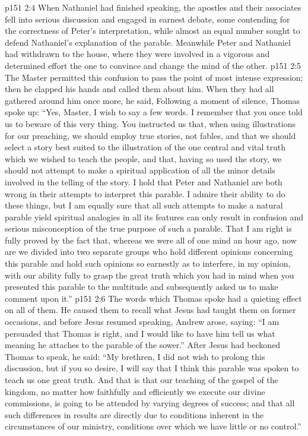 \vs p151 2:4 When Nathaniel had finished speaking, the apostles and their associates fell into serious discussion and engaged in earnest debate, some contending for the correctness of Peter’s interpretation, while almost an equal number sought to defend Nathaniel’s explanation of the parable. Meanwhile Peter and Nathaniel had withdrawn to the house, where they were involved in a vigorous and determined effort the one to convince and change the mind of the other.
\vs p151 2:5 The Master permitted this confusion to pass the point of most intense expression; then he clapped his hands and called them about him. When they had all gathered around him once more, he said,  Following a moment of silence, Thomas spoke up: “Yes, Master, I wish to say a few words. I remember that you once told us to beware of this very thing. You instructed us that, when using illustrations for our preaching, we should employ true stories, not fables, and that we should select a story best suited to the illustration of the one central and vital truth which we wished to teach the people, and that, having so used the story, we should not attempt to make a spiritual application of all the minor details involved in the telling of the story. I hold that Peter and Nathaniel are both wrong in their attempts to interpret this parable. I admire their ability to do these things, but I am equally sure that all such attempts to make a natural parable yield spiritual analogies in all its features can only result in confusion and serious misconception of the true purpose of such a parable. That I am right is fully proved by the fact that, whereas we were all of one mind an hour ago, now are we divided into two separate groups who hold different opinions concerning this parable and hold such opinions so earnestly as to interfere, in my opinion, with our ability fully to grasp the great truth which you had in mind when you presented this parable to the multitude and subsequently asked us to make comment upon it.”
\vs p151 2:6 The words which Thomas spoke had a quieting effect on all of them. He caused them to recall what Jesus had taught them on former occasions, and before Jesus resumed speaking, Andrew arose, saying: “I am persuaded that Thomas is right, and I would like to have him tell us what meaning he attaches to the parable of the sower.” After Jesus had beckoned Thomas to speak, he said: “My brethren, I did not wish to prolong this discussion, but if you so desire, I will say that I think this parable was spoken to teach us one great truth. And that is that our teaching of the gospel of the kingdom, no matter how faithfully and efficiently we execute our divine commissions, is going to be attended by varying degrees of success; and that all such differences in results are directly due to conditions inherent in the circumstances of our ministry, conditions over which we have little or no control.”

